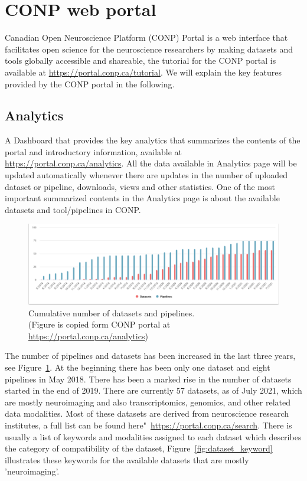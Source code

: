  









\section{CONP web portal}

Canadian Open Neuroscience Platform (CONP) Portal is a web interface that facilitates open science for the neuroscience researchers by making datasets and tools globally accessible and shareable, the tutorial for the CONP portal is available at \url{https://portal.conp.ca/tutorial}. We will explain the key features provided by the CONP portal in the following. 

\subsection{Analytics}
A Dashboard that provides the key analytics that summarizes the  contents of the portal and introductory information, available at \url{https://portal.conp.ca/analytics}. All the data available in Analytics page will be updated automatically whenever there are updates in the number of uploaded dataset or pipeline, downloads, views and other statistics. One of the most important summarized contents in the Analytics page is about the available datasets and tool/pipelines in CONP.

\begin{figure}[ht]
  \centering
  \includegraphics[width=\textwidth,height=\textheight,keepaspectratio]{figures/PipeDataTime.png}
  \caption{Cumulative number of datasets and pipelines. \\(Figure is copied form CONP portal at \url{https://portal.conp.ca/analytics})}
  \label{fig:cumulative}
  \end{figure}

The number of pipelines and datasets has been increased in the last three years, see Figure~\ref{fig:cumulative}. At the beginning there has been only one dataset and eight pipelines in May 2018. There has been a marked rise in the number of datasets started in the end of 2019.
There are currently 57 datasets, as of July 2021, which are mostly neuroimaging and also transcriptomics, genomics, and other related data modalities. Most of these datasets are derived from neuroscience research institutes, a full list can be found here"~\url{https://portal.conp.ca/search}. There is usually a list of keywords and modalities assigned to each dataset which describes the category of compatibility of the dataset, Figure~\ref{fig:dataset_keyword} illustrates these keywords for the available datasets that are mostly 'neuroimaging'. 

